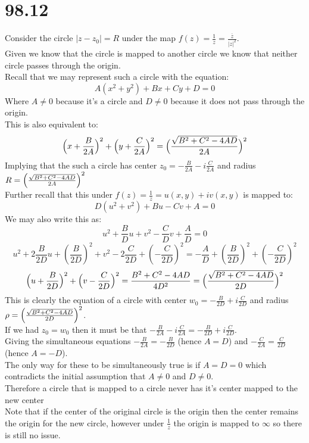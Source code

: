 \documentclass{article}
\begin{document}
\section*{98.12}
\begin{center}
    \doublespacing
    Consider the circle $|z - z_0| = R$ under the map $f(z) =\frac{1}{z} =\frac{\overline{z}}{|z|^2}$.
    \\Given we know that the circle is mapped to another circle we know that neither circle passes through the origin.
    \\Recall that we may represent such a circle with the equation:
    \[A(x^2 + y^2) + Bx + Cy + D = 0\]
    Where $A\neq 0$ because it's a circle and $D\neq 0$ because it does not pass through the origin.
    \\This is also equivalent to:
    \[\Big{(}x +\frac{B}{2A}\Big{)}^2 +\Big{(}y +\frac{C}{2A}\Big{)}^2 =\Big{(}\frac{\sqrt{B^2 + C^2 - 4AD}}{2A}\Big{)}^2\]
    Implying that the such a circle has center $z_0 = -\frac{B}{2A} - i\frac{C}{2A}$ and radius $R =\Big{(}\frac{\sqrt{B^2 + C^2 - 4AD}}{2A}\Big{)}^2$
    \\Further recall that this under $f(z) =\frac{1}{z} = u(x, y) + iv(x, y)$ is mapped to:
    \[D(u^2 + v^2) + Bu - Cv + A = 0\]
    We may also write this as:
    \[u^2 +\frac{B}{D} u + v^2 -\frac{C}{D} v +\frac{A}{D} = 0\]
    \[u^2 + 2\frac{B}{2D} u + (\frac{B}{2D})^2 + v^2 - 2\frac{C}{2D} + (-\frac{C}{2D})^2 = -\frac{A}{D} + (\frac{B}{2D})^2 + (-\frac{C}{2D})^2\]
    \[\Big{(}u +\frac{B}{2D}\Big{)}^2 +\Big{(}v -\frac{C}{2D}\Big{)}^2 =\frac{B^2 + C^2 - 4AD}{4D^2} =\Big{(}\frac{\sqrt{B^2 + C^2 - 4AD}}{2D}\Big{)}^2\]
    This is clearly the equation of a circle with center $w_0 = -\frac{B}{2D} + i\frac{C}{2D}$ and radius $\rho =\Big{(}\frac{\sqrt{B^2 + C^2 - 4AD}}{2D}\Big{)}^2$.
    \\If we had $z_0 = w_0$ then it must be that $-\frac{B}{2A} - i\frac{C}{2A} = -\frac{B}{2D} + i\frac{C}{2D}$.
    \\Giving the simultaneous equations $-\frac{B}{2A} = -\frac{B}{2D}$ (hence $A = D$) and $-\frac{C}{2A} =\frac{C}{2D}$ (hence $A = -D$).
    \\The only way for these to be simultaneously true is if $A = D = 0$ which contradicts the initial assumption that $A\neq 0$ and $D\neq 0$.
    \\Therefore a circle that is mapped to a circle never has it's center mapped to the new center \qedsymbol
    \break
    \\Note that if the center of the original circle is the origin then the center remains the origin for the new circle, however under $\frac{1}{z}$ the origin is mapped to $\infty$ so there is still no issue.
\end{center}
\end{document}
